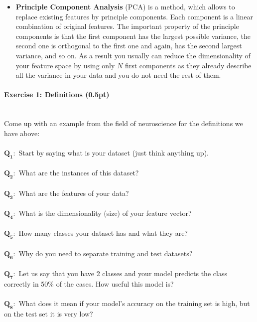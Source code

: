 \documentclass[a4paper,11pt]{article}
\newenvironment{exercise}[3]{\paragraph{Exercise #1: #2 (#3pt)}\ \\}{
\medskip}
\newcommand{\question}[2]{\setlength\parindent{0mm}\ \\$\mathbf{Q_#1:}$ #2\ \\}
\begin{document}
\begin{itemize}
	\item \textbf{Principle Component Analysis} (PCA) is a method, which allows to replace existing features by principle components. Each component is a linear combination of original features. The important property of the principle components is that the first component has the largest possible variance, the second one is orthogonal to the first one and again, has the second largest variance, and so on. As a result you usually can reduce the dimensionality of your feature space by using only $N$ first components as they already describe all the variance in your data and you do not need the rest of them.
\end{itemize}


%
%
\begin{exercise}{1}{Definitions}{0.5}
Come up with an example from the field of neuroscience for the definitions we have above:\\
\question{1}{Start by saying what is your dataset (just think anything up).}
\question{2}{What are the instances of this dataset?}
\question{3}{What are the features of your data?}
\question{4}{What is the dimensionality (size) of your feature vector?}
\question{5}{How many classes your dataset has and what they are?}
\question{6}{Why do you need to separate training and test datasets?}
\question{7}{Let us say that you have 2 classes and your model predicts the class correctly in 50\% of the cases. How useful this model is?}
\question{8}{What does it mean if your model's accuracy on the training set is high, but on the test set it is very low?}
\end{exercise}
\end{document}
